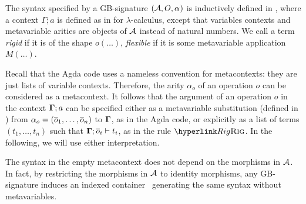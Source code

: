 The syntax specified by a GB-signature $({\cal A},O,\ntharvecfunct)$
is inductively defined in , where a context $\Gamma;a$
is defined as in  for $\lambda$-calculus,
except that variables contexts and metavariable arities are objects
of ${\cal A}$ instead of natural numbers. We call a term \emph{rigid
}if it is of the shape $o(\dots)$, \emph{flexible} if it is some
metavariable application $M(\dots)$.
\begin{remark}
\label{rem:arg-op-subst}Recall that the Agda code uses a nameless
convention for metacontexts: they are just lists of variable contexts.
Therefore, the arity \textup{$\alpha_{o}$} of an operation $o$ can
be considered as a metacontext. It follows that the argument of an
operation $o$ in the context $\dotmcontext{\Gamma};a$ can be specified
either as a metavariable substitution (defined in )
from $\alpha_{o}=(\nthar o1,\dots,\nthar on)$ to $\dotmcontext{\Gamma}$,
as in the Agda code, or explicitly as a list of terms $(t_{1},\dots,t_{n})$
such that $\dotmcontext{\Gamma};\nthar oi\vdash t_{i}$, as in the
rule $\refrule{Rig}$. In the following, we will use either interpretation.
\end{remark}
%
\begin{remark}
The syntax in the empty metacontext does not depend on the morphisms
in ${\cal A}$. In fact, by restricting the morphisms in ${\cal A}$
to identity morphisms, any GB-signature induces an indexed container~\citet{DBLP:conf/lics/AltenkirchM09}
generating the same syntax without metavariables.
\end{remark}
